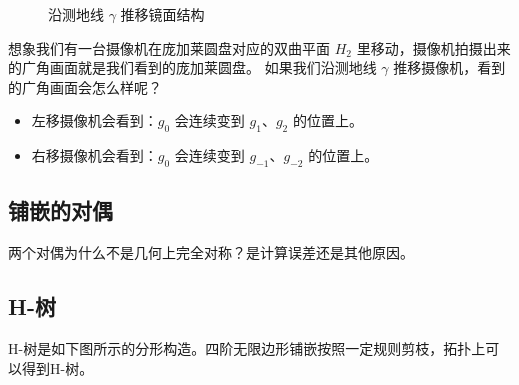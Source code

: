 \documentclass[a4paper,12pt]{article}
\begin{document}
\begin{figure}[ht]
\caption{沿测地线 $\gamma$ 推移镜面结构}
\end{figure}

想象我们有一台摄像机在庞加莱圆盘对应的双曲平面 $H_2$ 里移动，摄像机拍摄出来的广角画面就是我们看到的庞加莱圆盘。
如果我们沿测地线 $\gamma$ 推移摄像机，看到的广角画面会怎么样呢？
\begin{itemize}
    \item 左移摄像机会看到：$g_0$ 会连续变到 $g_1$、$g_2$ 的位置上。
    \item 右移摄像机会看到：$g_0$ 会连续变到 $g_{-1}$、$g_{-2}$ 的位置上。
\end{itemize}

\newpage

\subsection{铺嵌的对偶}


两个对偶为什么不是几何上完全对称？是计算误差还是其他原因。

\newpage

\subsection{H-树}

H-树是如下图所示的分形构造。四阶无限边形铺嵌按照一定规则剪枝，拓扑上可以得到H-树。
\end{document}
